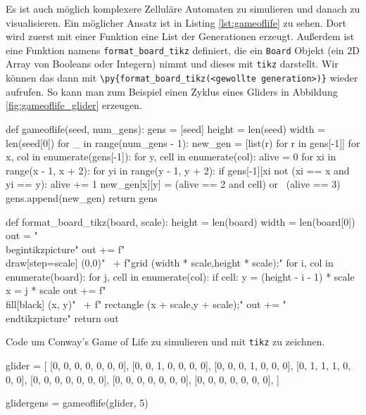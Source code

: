 \documentclass[11pt,a4paper]{article}
\begin{document}
%
Es ist auch möglich komplexere Zelluläre Automaten zu simulieren und danach zu visualisieren.
%
Ein möglicher Ansatz ist in Listing \ref{lst:gameoflife} zu sehen.
%
Dort wird zuerst mit einer Funktion eine List der Generationen erzeugt.
%
Außerdem ist eine Funktion namens \texttt{format\_board\_tikz} definiert, die ein \texttt{Board} Objekt (ein 2D Array von Booleans oder Integern) nimmt und dieses mit \texttt{tikz} darstellt.
%
Wir können das dann mit \verb#\py{format_board_tikz(<gewollte generation>)}# wieder aufrufen.
%
So kann man zum Beispiel einen Zyklus eines Gliders in Abbildung \ref{fig:gameoflife_glider} erzeugen.
%
\begin{listing}[H]
  \centering
  \begin{pyblock}
def gameoflife(seed, num_gens):
    gens = [seed]
    height = len(seed)
    width = len(seed[0])
    for _ in range(num_gens - 1):
        new_gen = [list(r) for r in gens[-1]]
        for x, col in enumerate(gens[-1]):
            for y, cell in enumerate(col):
                alive = 0
                for xi in range(x - 1, x + 2):
                    for yi in range(y - 1, y + 2):
                        if gens[-1][xi %
                           not (xi == x and yi == y):
                            alive += 1
                new_gen[x][y] = (alive == 2 and cell) or \
                                (alive == 3)
        gens.append(new_gen)
    return gens

def format_board_tikz(board, scale):
    height = len(board)
    width = len(board[0])
    out = "\\begin{tikzpicture}\n"
    out += f"\\draw[step={scale}] (0,0)" \
           + f"grid ({width * scale},{height * scale});\n"
    for i, col in enumerate(board):
        for j, cell in enumerate(col):
            if cell:
                y = (height - i - 1) * scale
                x = j * scale
                out += f"\\fill[black] ({x}, {y})" \
                       + f" rectangle ({x + scale},{y + scale});\n"
    out += "\\end{tikzpicture}\n"
    return out
  \end{pyblock}
  \caption{Code um Conway's Game of Life zu simulieren und mit \texttt{tikz} zu zeichnen.}
  \label{lst:gameoflife}
\end{listing}
%
\begin{pycode}
glider = [
    [0, 0, 0, 0, 0, 0, 0],
    [0, 0, 1, 0, 0, 0, 0],
    [0, 0, 0, 1, 0, 0, 0],
    [0, 1, 1, 1, 0, 0, 0],
    [0, 0, 0, 0, 0, 0, 0],
    [0, 0, 0, 0, 0, 0, 0],
    [0, 0, 0, 0, 0, 0, 0],
]

glidergens = gameoflife(glider, 5)
\end{pycode}
\end{document}
